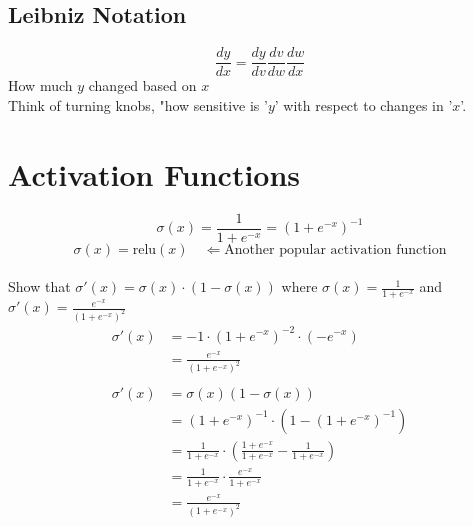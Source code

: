 \subsection{Leibniz Notation}
\[
\frac{dy}{dx} = \frac{dy}{dv} \frac{dv}{dw} \frac{dw}{dx}
\]
How much $y$ changed based on $x$ \\
Think of turning knobs, "how sensitive is '$y$' with respect to changes in '$x$'.

\section{Activation Functions}

$$\sigma(x) = \frac{1}{1+e^{-x}} = (1+e^{-x})^{-1}$$
$$\sigma(x) = \text{relu}(x) \quad \Leftarrow\text{Another popular activation function}$$
\\
Show that $\sigma'(x) = \sigma(x) \cdot (1-\sigma(x))$ where $\sigma(x) = \frac{1}{1+e^{-x}}$ and $\sigma'(x) = \frac{e^{-x}}{(1+e^{-x})^2}$
\begin{align}
\sigma'(x) &= -1 \cdot (1+e^{-x})^{-2} \cdot (-e^{-x}) \\
&= \frac{e^{-x}}{(1+e^{-x})^2} \\
\\
\sigma'(x) &= \sigma(x)(1-\sigma(x)) \\
&= (1+e^{-x})^{-1} \cdot \left( 1 - (1+e^{-x})^{-1} \right) \\
&= \frac{1}{1+e^{-x}} \cdot \left( \frac{1+e^{-x}}{1+e^{-x}} - \frac{1}{1+e^{-x}} \right) \\
&= \frac{1}{1+e^{-x}} \cdot \frac{e^{-x}}{1+e^{-x}} \\
&= \frac{e^{-x}}{(1+e^{-x})^2}
\end{align}

